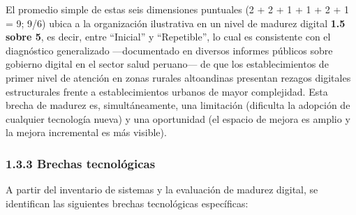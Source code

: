 \documentclass[11pt,a4paper]{article}
\begin{document}
El promedio simple de estas seis dimensiones puntuales (2 + 2 + 1 + 1 + 2 + 1 = 9; 9/6) ubica a la organización ilustrativa en un nivel de madurez digital \textbf{1.5 sobre 5}, es decir, entre ``Inicial'' y ``Repetible'', lo cual es consistente con el diagnóstico generalizado ---documentado en diversos informes públicos sobre gobierno digital en el sector salud peruano--- de que los establecimientos de primer nivel de atención en zonas rurales altoandinas presentan rezagos digitales estructurales frente a establecimientos urbanos de mayor complejidad. Esta brecha de madurez es, simultáneamente, una limitación (dificulta la adopción de cualquier tecnología nueva) y una oportunidad (el espacio de mejora es amplio y la mejora incremental es más visible).

\subsubsection{1.3.3 Brechas tecnológicas}\label{brechas-tecnoluxf3gicas}

A partir del inventario de sistemas y la evaluación de madurez digital, se identifican las siguientes brechas tecnológicas específicas:
\end{document}
